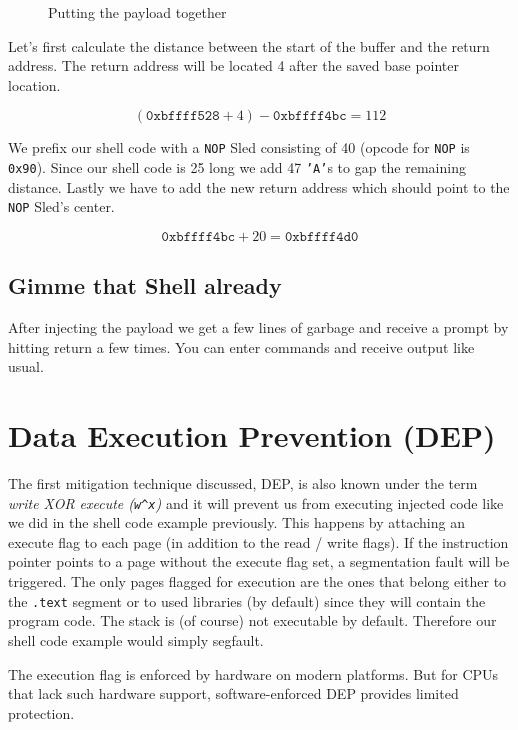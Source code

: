 \documentclass[article]{uibk}
\begin{document}
\begin{figure}[H]
    \centering
    
    \caption{Putting the payload together}
    \label{fig:shell_code}
\end{figure}

Let's first calculate the distance between the start of the buffer and the
return address. The return address will be located \SI{4}{\byte} after the
saved base pointer location.

\[(\texttt{0xbffff528} + 4) - \texttt{0xbffff4bc} = 112\]

We prefix our shell code with a \texttt{NOP} Sled consisting of \SI{40}{\byte}
(opcode for \texttt{NOP} is \texttt{0x90}). Since our shell code is \SI{25}{\byte}
long we add 47 \texttt{'A'}s to gap the remaining distance. Lastly we have to add
the new return address which should point to the \texttt{NOP} Sled's center.

\[\texttt{0xbffff4bc} + 20 = \texttt{0xbffff4d0}\]

\subsection{Gimme that Shell already}


After injecting the payload we get a few lines of garbage and receive a prompt
by hitting return a few times. You can enter commands and receive output like
usual.

\section{Data Execution Prevention (DEP)}

The first mitigation technique discussed, DEP, is also known under the term
\textit{write XOR execute (\texttt{w\^{}x})} and it will prevent us from
executing injected code like we did in the shell code example previously. This
happens by attaching an execute flag to each page (in addition to the read /
write flags). If the instruction pointer points to a page without the execute
flag set, a segmentation fault will be triggered. The only pages flagged for
execution are the ones that belong either to the \texttt{.text} segment or to
used libraries (by default) since they will contain the program code. The stack
is (of course) not executable by default. Therefore our shell code example
would simply segfault.

The execution flag is enforced by hardware on modern platforms. But for CPUs
that lack such hardware support, software-enforced DEP provides limited
protection.~\cite{wiki:dep}
\end{document}
